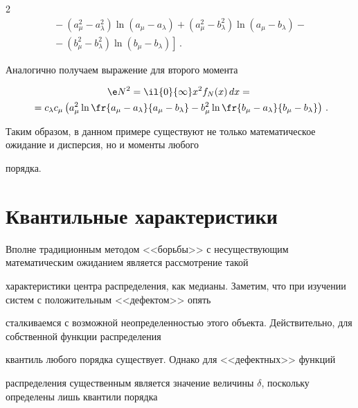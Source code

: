 \begin{multicols}{2}
\begin{multline*}
{}-


(a_\mu^2-a_\lambda^2)\ln\left(a_\mu-a_\lambda\right)+\left(a_\mu^2-b_\lambda^2\right)\ln


\left(a_\mu-b_\lambda\right)-{}\\


\left.{}-\left(b_\mu^2-b_\lambda^2\right)\ln\left(b_\mu-b_\lambda\right)\right]\,.


\end{multline*}





Аналогично получаем выражение для второго момента


\begin{multline*}


\e N^2=\il{0}{\infty}x^2f_N(x)\,dx={}\\


{}=c_\lambda c_\mu\left(a_\mu^2\ln\fr{a_\mu-a_\lambda}


{a_\mu-b_\lambda}-b_\mu^2\ln\fr{b_\mu-a_\lambda}{b_\mu-b_\lambda}\right)\,.


\end{multline*}





Таким образом, в данном примере существуют не только математическое ожидание и дисперсия, но и моменты любого


порядка.





\section{Квантильные характеристики}





Вполне традиционным методом <<борьбы>> с несуществующим математическим ожиданием является рассмотрение такой


характеристики центра распределения, как медианы. Заметим, что при изучении систем с положительным <<дефектом>> опять


сталкиваемся с возможной неопреде\-лен\-ностью этого объекта. Действительно, для собственной функции распределения


квантиль любого порядка существует. Однако для <<дефектных>> функций


распределения существенным является значение величины $\delta$, поскольку определены лишь квантили порядка 



\end{multicols}
